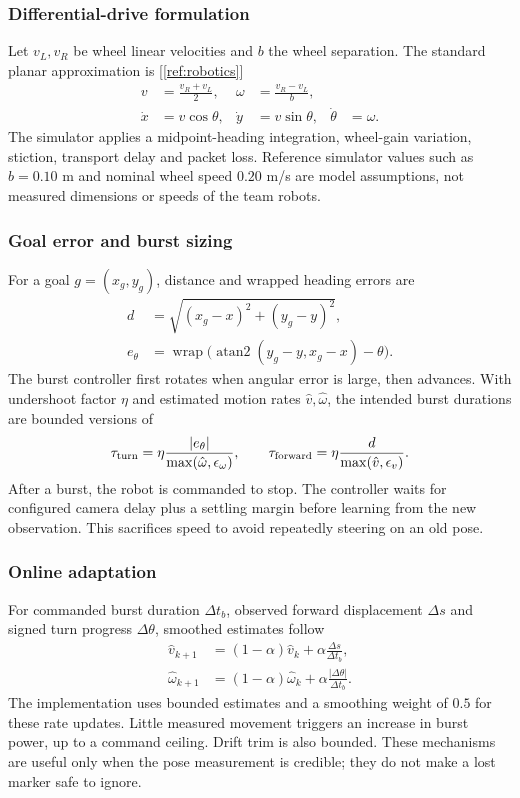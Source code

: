\documentclass[11pt,a4paper]{article}
\newcommand{\citesrc}[1]{[\ref{ref:#1}]}
\begin{document}
\subsubsection*{Differential-drive formulation}
Let $v_L,v_R$ be wheel linear velocities and $b$ the wheel separation. The standard
planar approximation is \citesrc{robotics}
\begin{align}
v&=\frac{v_R+v_L}{2}, & \omega&=\frac{v_R-v_L}{b},\\
\dot{x}&=v\cos\theta, & \dot{y}&=v\sin\theta, & \dot{\theta}&=\omega.
\end{align}
The simulator applies a midpoint-heading integration, wheel-gain variation,
stiction, transport delay and packet loss. Reference simulator values such as
$b=0.10$ m and nominal wheel speed $0.20$ m/s are model assumptions, not measured
dimensions or speeds of the team robots.

\subsubsection*{Goal error and burst sizing}
For a goal $g=(x_g,y_g)$, distance and wrapped heading errors are
\begin{align}
d&=\sqrt{(x_g-x)^2+(y_g-y)^2},\\
e_\theta&=\operatorname{wrap}\big(\operatorname{atan2}(y_g-y,x_g-x)-\theta\big).
\end{align}
The burst controller first rotates when angular error is large, then advances.
With undershoot factor $\eta$ and estimated motion rates $\hat{v},\hat{\omega}$,
the intended burst durations are bounded versions of
\begin{equation}
\tau_{\rm turn}=\eta\frac{|e_\theta|}{\max(\hat\omega,\epsilon_\omega)},
\qquad \tau_{\rm forward}=\eta\frac{d}{\max(\hat v,\epsilon_v)}.
\end{equation}
After a burst, the robot is commanded to stop. The controller waits for configured
camera delay plus a settling margin before learning from the new observation.
This sacrifices speed to avoid repeatedly steering on an old pose.

\subsubsection*{Online adaptation}
For commanded burst duration $\Delta t_b$, observed forward displacement $\Delta s$
and signed turn progress $\Delta\theta$, smoothed estimates follow
\begin{align}
\hat v_{k+1}&=(1-\alpha)\hat v_k+\alpha\frac{\Delta s}{\Delta t_b},\\
\hat\omega_{k+1}&=(1-\alpha)\hat\omega_k+\alpha\frac{|\Delta\theta|}{\Delta t_b}.
\end{align}
The implementation uses bounded estimates and a smoothing weight of $0.5$ for
these rate updates. Little measured movement triggers an increase in burst power,
up to a command ceiling. Drift trim is also bounded. These mechanisms are useful
only when the pose measurement is credible; they do not make a lost marker safe
to ignore.
\end{document}
